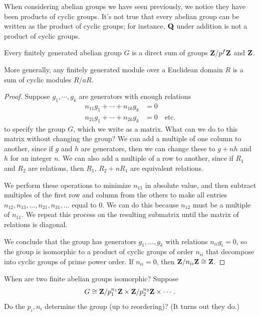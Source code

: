 \documentclass[11pt, oneside]{amsart}
\begin{document}
When considering abelian groups we have seen previously, we notice they have been products of cyclic groups. It's not true that every abelian group can be written as the product of cyclic groups; for instance, $\mathbf Q $ under addition is not a product of cyclic groups.

\begin{theorem}\label{decomp}
Every finitely generated abelian group $G$ is a direct sum of groups $\mathbf Z/p^f\mathbf Z$ and $\mathbf Z$.
\end{theorem}
More generally, any finitely generated module over a Euclidean domain $R$ is a sum of cyclic modules $R/aR$.
\begin{proof}
Suppose $g_1 ,\cdots,g_k$ are generators with enough relations
\begin{align*}
n_{11}g_1 + \cdots + n_{1k} g_k &= 0\\
n_{21} g_1 + \cdots + n_{2k} g_k&=0\quad \mathrm{etc.}
\end{align*}
to specify the group $G$, which we write as a matrix. What can we do to this matrix without changing the group? We can add a multiple of one column to another, since if $g$ and $h$ are generators, then we can change these to $g+nh$ and $h$ for an integer $n$. We can also add a multiple of a row to another, since if $R_1$ and $R_2$ are relations, then $R_1$, $R_2+nR_1$ are equivalent relations.

We perform these operations to minimize $n_{11}$ in absolute value, and then subtract multiples of the first row and column from the others to make all entries $n_{12}, n_{13},\hdots,n_{21}, n_{31} ,\hdots$ equal to $0$. We can do this because $n_{12}$ must be a multiple of $n_{11}$. We repeat this process on the resulting submatrix until the matrix of relations is diagonal.

We conclude that the group has generators $g_1,\hdots,g_k$ with relations $n_{ii} g_i = 0$, so the group is isomorphic to a product of cyclic groups of order $n_{ii}$ that decompose into cyclic groups of prime power order. If $n_{ii} = 0$, then $\mathbf Z/n_{ii}\mathbf Z \cong \mathbf Z$.
\end{proof}

When are two finite abelian groups isomorphic? Suppose 
$$
G \cong \mathbf Z/p_1^{n_1}\mathbf Z \times \mathbf Z /p_2^{n_2}\mathbf Z \times \cdots.
$$
Do the $p_i,n_i$ determine the group (up to reordering)? (It turns out they do.) %
\end{document}
